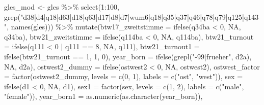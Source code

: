 \documentclass[
]{article}
\newenvironment{Shaded}{\begin{snugshade}}{\end{snugshade}}
\newcommand{\AttributeTok}[1]{\textcolor[rgb]{0.77,0.63,0.00}{#1}}
\newcommand{\ConstantTok}[1]{\textcolor[rgb]{0.00,0.00,0.00}{#1}}
\newcommand{\DecValTok}[1]{\textcolor[rgb]{0.00,0.00,0.81}{#1}}
\newcommand{\FunctionTok}[1]{\textcolor[rgb]{0.00,0.00,0.00}{#1}}
\newcommand{\NormalTok}[1]{#1}
\newcommand{\OtherTok}[1]{\textcolor[rgb]{0.56,0.35,0.01}{#1}}
\newcommand{\SpecialCharTok}[1]{\textcolor[rgb]{0.00,0.00,0.00}{#1}}
\newcommand{\StringTok}[1]{\textcolor[rgb]{0.31,0.60,0.02}{#1}}
\begin{document}
\begin{Shaded}
\begin{Highlighting}[]
\NormalTok{gles\_mod }\OtherTok{\textless{}{-}}\NormalTok{ gles }\SpecialCharTok{\%\textgreater{}\%} 
  \FunctionTok{select}\NormalTok{(}\DecValTok{1}\SpecialCharTok{:}\DecValTok{100}\NormalTok{, }\FunctionTok{grep}\NormalTok{(}\StringTok{"d38|d4|q18|d63|d18|q63|d17|d8|d7|wum6|q18|q35|q37|q46|q78|q79|q125|q143"}\NormalTok{, }\FunctionTok{names}\NormalTok{(gles))) }\SpecialCharTok{\%\textgreater{}\%}
  \FunctionTok{mutate}\NormalTok{(}\AttributeTok{btw17\_zweitstimme =} \FunctionTok{ifelse}\NormalTok{(q34ba }\SpecialCharTok{\textless{}} \DecValTok{0}\NormalTok{, }\ConstantTok{NA}\NormalTok{, q34ba),}
         \AttributeTok{btw21\_zweitstimme =} \FunctionTok{ifelse}\NormalTok{(q114ba }\SpecialCharTok{\textless{}} \DecValTok{0}\NormalTok{, }\ConstantTok{NA}\NormalTok{, q114ba),}
         \AttributeTok{btw21\_turnout =} \FunctionTok{ifelse}\NormalTok{(q111 }\SpecialCharTok{\textless{}} \DecValTok{0} \SpecialCharTok{|}\NormalTok{ q111 }\SpecialCharTok{==} \DecValTok{8}\NormalTok{, }\ConstantTok{NA}\NormalTok{, q111),}
         \AttributeTok{btw21\_turnout1 =} \FunctionTok{ifelse}\NormalTok{(btw21\_turnout }\SpecialCharTok{==} \DecValTok{1}\NormalTok{, }\DecValTok{1}\NormalTok{, }\DecValTok{0}\NormalTok{),}
         \AttributeTok{year\_born =} \FunctionTok{ifelse}\NormalTok{(}\FunctionTok{grepl}\NormalTok{(}\StringTok{"{-}99|frueher"}\NormalTok{, d2a), }\ConstantTok{NA}\NormalTok{, d2a),}
         \AttributeTok{ostwest2\_dummy =} \FunctionTok{ifelse}\NormalTok{(ostwest2 }\SpecialCharTok{\textless{}} \DecValTok{0}\NormalTok{, }\ConstantTok{NA}\NormalTok{, ostwest2),}
         \AttributeTok{ostwest\_factor =} \FunctionTok{factor}\NormalTok{(ostwest2\_dummy, }
                                 \AttributeTok{levels =} \FunctionTok{c}\NormalTok{(}\DecValTok{0}\NormalTok{, }\DecValTok{1}\NormalTok{), }
                                 \AttributeTok{labels =} \FunctionTok{c}\NormalTok{(}\StringTok{"ost"}\NormalTok{, }\StringTok{"west"}\NormalTok{)),}
         \AttributeTok{sex =} \FunctionTok{ifelse}\NormalTok{(d1 }\SpecialCharTok{\textless{}} \DecValTok{0}\NormalTok{, }\ConstantTok{NA}\NormalTok{, d1),}
         \AttributeTok{sex1 =} \FunctionTok{factor}\NormalTok{(sex, }\AttributeTok{levels =} \FunctionTok{c}\NormalTok{(}\DecValTok{1}\NormalTok{, }\DecValTok{2}\NormalTok{), }
                       \AttributeTok{labels =} \FunctionTok{c}\NormalTok{(}\StringTok{"male"}\NormalTok{, }\StringTok{"female"}\NormalTok{)),}
         \AttributeTok{year\_born1 =} \FunctionTok{as.numeric}\NormalTok{(}\FunctionTok{as.character}\NormalTok{(year\_born)),}

\end{Highlighting}
\end{Shaded}
\end{document}
